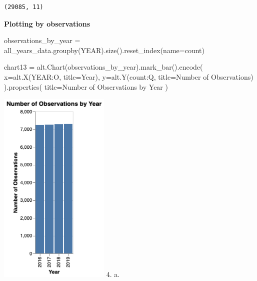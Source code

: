 \documentclass[
  letterpaper,
  DIV=11,
  numbers=noendperiod]{scrartcl}
\newenvironment{Shaded}{\begin{snugshade}}{\end{snugshade}}
\newcommand{\NormalTok}[1]{\textcolor[rgb]{0.00,0.23,0.31}{#1}}
\newcommand{\OperatorTok}[1]{\textcolor[rgb]{0.37,0.37,0.37}{#1}}
\newcommand{\StringTok}[1]{\textcolor[rgb]{0.13,0.47,0.30}{#1}}
\begin{document}
\begin{verbatim}
(29085, 11)
\end{verbatim}

\textbf{Plotting by observations}

\begin{Shaded}
\begin{Highlighting}[]
\NormalTok{observations\_by\_year }\OperatorTok{=}\NormalTok{ all\_years\_data.groupby(}\StringTok{\textquotesingle{}YEAR\textquotesingle{}}\NormalTok{).size().reset\_index(name}\OperatorTok{=}\StringTok{\textquotesingle{}count\textquotesingle{}}\NormalTok{)}

\NormalTok{chart13 }\OperatorTok{=}\NormalTok{ alt.Chart(observations\_by\_year).mark\_bar().encode(}
\NormalTok{    x}\OperatorTok{=}\NormalTok{alt.X(}\StringTok{\textquotesingle{}YEAR:O\textquotesingle{}}\NormalTok{, title}\OperatorTok{=}\StringTok{\textquotesingle{}Year\textquotesingle{}}\NormalTok{),}
\NormalTok{    y}\OperatorTok{=}\NormalTok{alt.Y(}\StringTok{\textquotesingle{}count:Q\textquotesingle{}}\NormalTok{, title}\OperatorTok{=}\StringTok{\textquotesingle{}Number of Observations\textquotesingle{}}\NormalTok{)  }
\NormalTok{).properties(}
\NormalTok{    title}\OperatorTok{=}\StringTok{\textquotesingle{}Number of Observations by Year\textquotesingle{}}
\NormalTok{)}
\end{Highlighting}
\end{Shaded}

\includegraphics[width=2.08333in,height=\textheight,keepaspectratio]{s1p1.png}
4. a.
\end{document}
